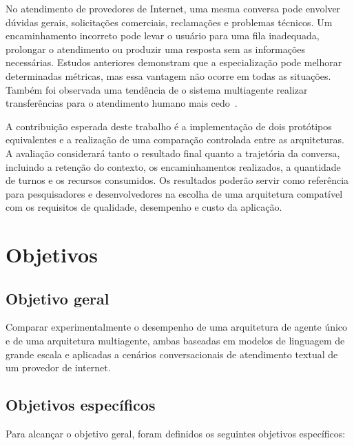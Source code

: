 No atendimento de provedores de Internet, uma mesma conversa pode envolver dúvidas gerais, solicitações comerciais, reclamações e problemas técnicos. Um encaminhamento incorreto pode levar o usuário para uma fila inadequada, prolongar o atendimento ou produzir uma resposta sem as informações necessárias. Estudos anteriores demonstram que a especialização pode melhorar determinadas métricas, mas essa vantagem não ocorre em todas as situações. Também foi observada uma tendência de o sistema multiagente realizar transferências para o atendimento humano mais cedo~\cite{amri2026}.

A contribuição esperada deste trabalho é a implementação de dois protótipos equivalentes e a realização de uma comparação controlada entre as arquiteturas. A avaliação considerará tanto o resultado final quanto a trajetória da conversa, incluindo a retenção do contexto, os encaminhamentos realizados, a quantidade de turnos e os recursos consumidos. Os resultados poderão servir como referência para pesquisadores e desenvolvedores na escolha de uma arquitetura compatível com os requisitos de qualidade, desempenho e custo da aplicação.

\section{Objetivos}\label{sec:objetivos}

\subsection{Objetivo geral}\label{subsec:objetivo-geral}

Comparar experimentalmente o desempenho de uma arquitetura de agente único e de uma arquitetura multiagente, ambas baseadas em modelos de linguagem de grande escala e aplicadas a cenários conversacionais de atendimento textual de um provedor de internet.

\subsection{Objetivos específicos}\label{subsec:objetivos-especificos}

Para alcançar o objetivo geral, foram definidos os seguintes objetivos específicos:

